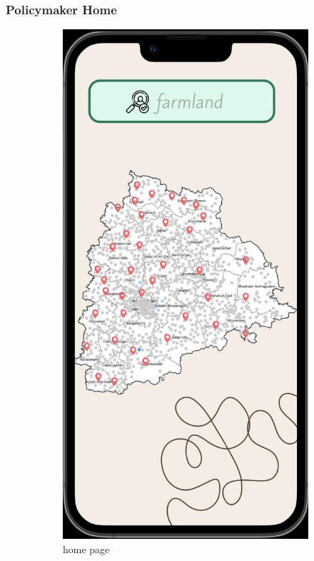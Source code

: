 \subsubsection{Policymaker Home}
\begin{figure}[ht] 
  \begin{subfigure}[b]{0.6\linewidth}
    \centering
    \includegraphics[width=0.8\linewidth]{figures/policyMakerMainPage.png}
    \caption{home page} 
    \label{fig:a} 
    \vspace{4ex}
  \end{subfigure}%
  \begin{subfigure}[b]{0.6\linewidth}

\end{subfigure}
\end{figure}
